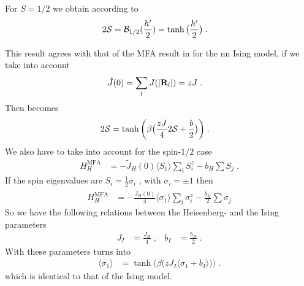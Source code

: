 For $S=1/2$ we obtain according to  
\begin{align}\label{eq:heisenberg:mfa:orderparameter}
2{\cal S} &={\cal B}_{1/2}(\frac{h'}{2}) = \tanh\big(\frac{h'}{2}\big)\;.
\end{align}
%

This result agrees with that of the MFA result in  for the nn Ising model, if we take into account 
%
\begin{align*}
\tilde J(0) &= \sum_{l}J(\abs{\mathbf R_{l}}) = z J \;.
\end{align*}
%
Then  becomes
%
\begin{align}\label{eq:hb:mfa:oderparameter}
2 {\cal S} &= \tanh\bigg( \beta\big( \frac{z J}{4} {2 \cal S}  +  \frac{b}{2}\big) \bigg)\;.
\end{align}
%
We also have to take into account for the spin-$1/2$ case
%
\begin{align*}
H^\text{MFA}_{H} &= -\tilde J_{H}(0) \langle S_{1} \rangle \sum_{i} S_{i}^{z} - b_{H}   \sum S_{j}\;.
\end{align*}
%
If the spin eigenvalues are  $S_{i}=\frac{1}{2} \sigma_{i}$ , with $\sigma_{i}=\pm 1$ then
\begin{align*}
H^\text{MFA}_{H} &= -\frac{\tilde J_{H}(0)}{4}  \langle \sigma_{1} \rangle\sum_{i} \sigma_{i}^{z} - \frac{b_{H}}{2}   \sum \sigma_{j}
\end{align*}
So we have the following relations between the Heisenberg- and the Ising parameters
%
\begin{align*}
J_{I} &= \frac{J_{H}}{4}\;, &b_{I} &= \frac{b_{H}}{2}\;.
\end{align*}
%
With these parameters  turns into
%
\begin{align*}
\langle \sigma_{1} \rangle &= \tanh\bigg( \beta\big( zJ_{I} \langle \sigma_{1}+b_{I} \rangle \big) \bigg)\;.
\end{align*}
%
which is identical to that of the Ising model.

